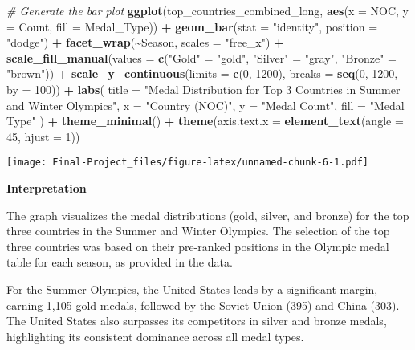 \documentclass[
]{article}
\newenvironment{Shaded}{\begin{snugshade}}{\end{snugshade}}
\newcommand{\AttributeTok}[1]{\textcolor[rgb]{0.13,0.29,0.53}{#1}}
\newcommand{\CommentTok}[1]{\textcolor[rgb]{0.56,0.35,0.01}{\textit{#1}}}
\newcommand{\DecValTok}[1]{\textcolor[rgb]{0.00,0.00,0.81}{#1}}
\newcommand{\FunctionTok}[1]{\textcolor[rgb]{0.13,0.29,0.53}{\textbf{#1}}}
\newcommand{\NormalTok}[1]{#1}
\newcommand{\OtherTok}[1]{\textcolor[rgb]{0.56,0.35,0.01}{#1}}
\newcommand{\SpecialCharTok}[1]{\textcolor[rgb]{0.81,0.36,0.00}{\textbf{#1}}}
\newcommand{\StringTok}[1]{\textcolor[rgb]{0.31,0.60,0.02}{#1}}
\begin{document}
\begin{Shaded}
\begin{Highlighting}[]
\CommentTok{\# Generate the bar plot}
\FunctionTok{ggplot}\NormalTok{(top\_countries\_combined\_long, }\FunctionTok{aes}\NormalTok{(}\AttributeTok{x =}\NormalTok{ NOC, }\AttributeTok{y =}\NormalTok{ Count, }\AttributeTok{fill =}\NormalTok{ Medal\_Type)) }\SpecialCharTok{+}
  \FunctionTok{geom\_bar}\NormalTok{(}\AttributeTok{stat =} \StringTok{"identity"}\NormalTok{, }\AttributeTok{position =} \StringTok{"dodge"}\NormalTok{) }\SpecialCharTok{+}
  \FunctionTok{facet\_wrap}\NormalTok{(}\SpecialCharTok{\textasciitilde{}}\NormalTok{Season, }\AttributeTok{scales =} \StringTok{"free\_x"}\NormalTok{) }\SpecialCharTok{+}
  \FunctionTok{scale\_fill\_manual}\NormalTok{(}\AttributeTok{values =} \FunctionTok{c}\NormalTok{(}\StringTok{"Gold"} \OtherTok{=} \StringTok{"gold"}\NormalTok{, }\StringTok{"Silver"} \OtherTok{=} \StringTok{"gray"}\NormalTok{, }\StringTok{"Bronze"} \OtherTok{=} \StringTok{"brown"}\NormalTok{)) }\SpecialCharTok{+}
  \FunctionTok{scale\_y\_continuous}\NormalTok{(}\AttributeTok{limits =} \FunctionTok{c}\NormalTok{(}\DecValTok{0}\NormalTok{, }\DecValTok{1200}\NormalTok{), }\AttributeTok{breaks =} \FunctionTok{seq}\NormalTok{(}\DecValTok{0}\NormalTok{, }\DecValTok{1200}\NormalTok{, }\AttributeTok{by =} \DecValTok{100}\NormalTok{)) }\SpecialCharTok{+}
  \FunctionTok{labs}\NormalTok{(}
    \AttributeTok{title =} \StringTok{"Medal Distribution for Top 3 Countries in Summer and Winter Olympics"}\NormalTok{,}
    \AttributeTok{x =} \StringTok{"Country (NOC)"}\NormalTok{,}
    \AttributeTok{y =} \StringTok{"Medal Count"}\NormalTok{,}
    \AttributeTok{fill =} \StringTok{"Medal Type"}
\NormalTok{  ) }\SpecialCharTok{+}
  \FunctionTok{theme\_minimal}\NormalTok{() }\SpecialCharTok{+}
  \FunctionTok{theme}\NormalTok{(}\AttributeTok{axis.text.x =} \FunctionTok{element\_text}\NormalTok{(}\AttributeTok{angle =} \DecValTok{45}\NormalTok{, }\AttributeTok{hjust =} \DecValTok{1}\NormalTok{))}
\end{Highlighting}
\end{Shaded}

\texttt{[image: Final-Project\_files/figure-latex/unnamed-chunk-6-1.pdf]}

\textbf{Interpretation}

The graph visualizes the medal distributions (gold, silver, and bronze)
for the top three countries in the Summer and Winter Olympics. The
selection of the top three countries was based on their pre-ranked
positions in the Olympic medal table for each season, as provided in the
data.

For the Summer Olympics, the United States leads by a significant
margin, earning 1,105 gold medals, followed by the Soviet Union (395)
and China (303). The United States also surpasses its competitors in
silver and bronze medals, highlighting its consistent dominance across
all medal types.
\end{document}

